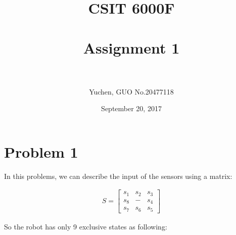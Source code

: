 \documentclass[paper=a4, fontsize=11pt]{scrartcl} %
\title{	
\normalfont \normalsize 
\textsc{CSIT 6000F} \\ [25pt] %
\horrule{0.5pt} \\[0.4cm] %
\huge Assignment 1 \\ %
\horrule{2pt} \\[0.5cm] %
}
\author{Yuchen, GUO   No.20477118} %
\date{\normalsize September 20, 2017} %
\numberwithin{equation}{section} %
\numberwithin{figure}{section} %
\numberwithin{table}{section} %
\begin{document}
\maketitle %


\section{Problem 1}

In this problems, we can describe the input of the sensors using a matrix:

\begin{align*}
S = 
\begin{bmatrix}
    s_1 & s_2 & s_3\\
    s_8 & - & s_4\\
    s_7 & s_6 & s_5
\end{bmatrix}
\end{align*}

So the robot has only 9 exclusive states as following:
\end{document}
